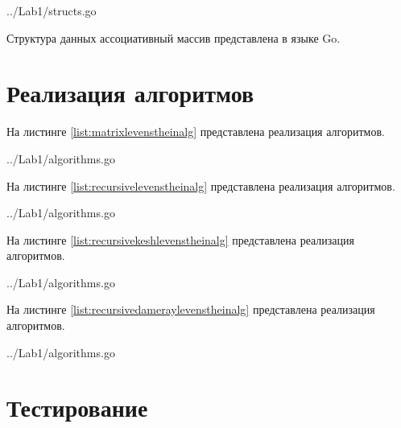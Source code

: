 \begin{lstinputlisting}
    [caption = {Структура специализированной матрицы Левенштейна},
    label = {list:levenshteinmatrixstruct},
    linerange={14-18},
    ]{../Lab1/structs.go}
\end{lstinputlisting}

Структура данных ассоциативный массив представлена в языке Go.

\section{Реализация алгоритмов}\label{Listings}

На листинге \ref{list:matrixlevenstheinalg} представлена реализация алгоритмов.

\begin{lstinputlisting}
    [caption = {Реализация матричного алгоритма поиска расстояния Левенштейна},
    label = {list:matrixlevenstheinalg},
    linerange={100-125},
    ]{../Lab1/algorithms.go}
\end{lstinputlisting}

На листинге \ref{list:recursivelevenstheinalg} представлена реализация алгоритмов.

\begin{lstinputlisting}
    [caption = {Реализация рекурсивного алгоритма поиска расстояния Левенштейна},
    label = {list:recursivelevenstheinalg},
    linerange={14-29},
    ]{../Lab1/algorithms.go}
\end{lstinputlisting}


На листинге \ref{list:recursivekeshlevenstheinalg} представлена реализация алгоритмов.

\begin{lstinputlisting}
    [caption = {Реализация рекурсивного алгоритма с кешем поиска расстояния Левенштейна},
    label = {list:recursivekeshlevenstheinalg},
    linerange={58-96},
    ]{../Lab1/algorithms.go}
\end{lstinputlisting}

На листинге \ref{list:recursivedameraylevenstheinalg} представлена реализация алгоритмов.

\begin{lstinputlisting}
    [caption = {Реализация рекурсивного алгоритма поиска расстояния Дамерау-Левенштейна},
    label = {list:recursivedameraylevenstheinalg},
    linerange={32-55},
    ]{../Lab1/algorithms.go}
\end{lstinputlisting}

\section{Тестирование}\label{TestResult}


